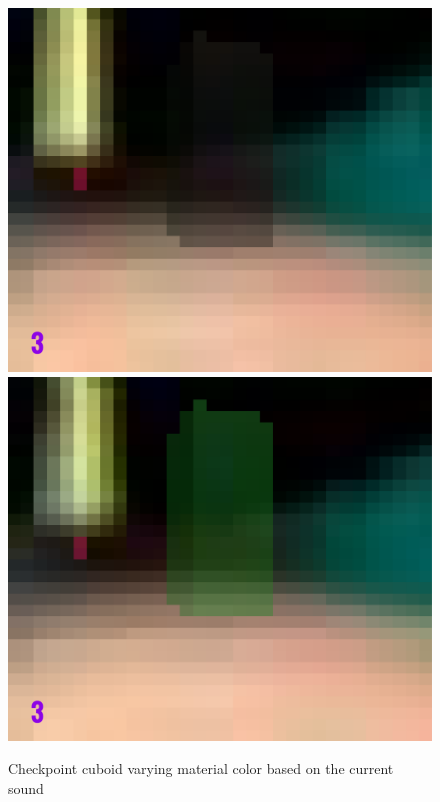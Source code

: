\begin{figure}[p]
  \centering
  \includegraphics[width=\imgWidth]{images/game_systems/CheckpointDim.png} \\[\picVdist]
  \includegraphics[width=\imgWidth]{images/game_systems/CheckpointBright.png}
  \caption{Checkpoint cuboid varying material color based on the current sound}
  \label{SonarBlinks}
\end{figure}

